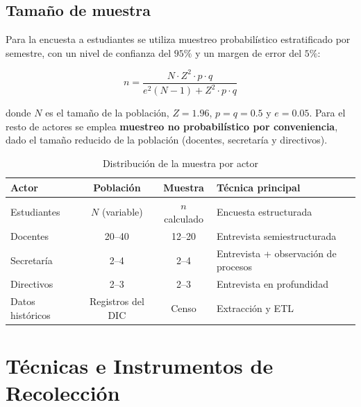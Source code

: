 \subsection{Tamaño de muestra}
Para la encuesta a estudiantes se utiliza muestreo probabilístico estratificado
por semestre, con un nivel de confianza del $95\%$ y un margen de error del $5\%$:

\begin{equation}
n = \frac{N \cdot Z^{2} \cdot p \cdot q}{e^{2}(N-1) + Z^{2} \cdot p \cdot q}
\label{eq:muestra}
\end{equation}

donde $N$ es el tamaño de la población, $Z = 1.96$, $p = q = 0.5$ y
$e = 0.05$. Para el resto de actores se emplea \textbf{muestreo no probabilístico
por conveniencia}, dado el tamaño reducido de la población (docentes, secretaría
y directivos).

\begin{table}[H]
\centering
\caption{Distribución de la muestra por actor}
\label{tab:muestra}
\begin{tabularx}{\textwidth}{@{}l c c X@{}}
\toprule
\rowcolor{verdeClaro}
\textbf{Actor} & \textbf{Población} & \textbf{Muestra} & \textbf{Técnica principal} \\
\midrule
Estudiantes & $N$ (variable) & $n$ calculado & Encuesta estructurada \\
Docentes & 20--40 & 12--20 & Entrevista semiestructurada \\
Secretaría & 2--4 & 2--4 & Entrevista + observación de procesos \\
Directivos & 2--3 & 2--3 & Entrevista en profundidad \\
Datos históricos & Registros del \ac{DIC} & Censo & Extracción y \ac{ETL} \\
\bottomrule
\end{tabularx}
\end{table}

\section{Técnicas e Instrumentos de Recolección}

